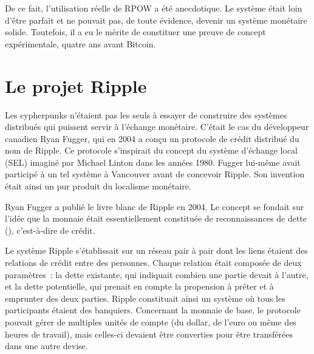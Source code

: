 De ce fait, l'utilisation réelle de RPOW a été anecdotique. Le système était loin d'être parfait et ne pouvait pas, de toute évidence, devenir un système monétaire solide. Toutefois, il a eu le mérite de constituer une preuve de concept expérimentale, quatre ans avant Bitcoin. %

\section*{Le projet Ripple} %

Les cypherpunks n'étaient pas les seuls à essayer de construire des systèmes distribués qui puissent servir à l'échange monétaire. C'était le cas du développeur canadien Ryan Fugger, qui en 2004 a conçu un protocole de crédit distribué du nom de Ripple. Ce protocole s'inspirait du concept du système d'échange local (SEL) imaginé par Michael Linton dans les années 1980. Fugger lui-même avait participé à un tel système à Vancouver avant de concevoir Ripple. Son invention était ainsi un pur produit du localisme monétaire. %

Ryan Fugger a publié le livre blanc de Ripple en 2004. Le concept se fondait sur l'idée que la monnaie était essentiellement constituée de reconnaissances de dette (), c'est-à-dire de crédit.

Le système Ripple s'établissait sur un réseau pair à pair dont les liens étaient des relations de crédit entre des personnes. Chaque relation était composée de deux paramètres~: la dette existante, qui indiquait combien une partie devait à l'autre, et la dette potentielle, qui prenait en compte la propension à prêter et à emprunter des deux parties. Ripple constituait ainsi un système où tous les participants étaient des banquiers. Concernant la monnaie de base, le protocole pouvait gérer de multiples unités de compte (du dollar, de l'euro ou même des heures de travail), mais celles-ci devaient être converties pour être transférées dans une autre devise.

